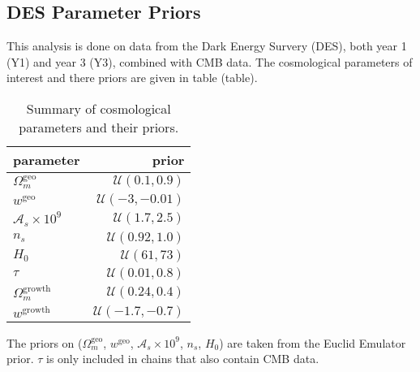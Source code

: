 \subsection{DES Parameter Priors}
This analysis is done on data from the Dark Energy Survery (DES), both year 1 (Y1) and year 3 (Y3), combined with CMB data. The cosmological parameters of interest and there priors are given in table (table).
\begin{table}
\centering
\begin{tabular}{lr}
	\hline
	parameter & prior \\
	\hline\hline
	$\Omega_m^{\text{geo}}$    & $\mathcal{U}(0.1,0.9)$   \\
	$w^{\mathrm{geo}}$         & $\mathcal{U}(-3,-0.01)$  \\
	$\mathcal{A}_s\times10^9$  & $\mathcal{U}(1.7,2.5)$   \\
	$n_s$                      & $\mathcal{U}(0.92,1.0)$  \\
	$H_0$                      & $\mathcal{U}(61,73)$     \\
	$\tau$                     & $\mathcal{U}(0.01,0.8)$  \\
	$\Omega_m^{\text{growth}}$ & $\mathcal{U}(0.24,0.4)$  \\
	$w^{\mathrm{growth}}$      & $\mathcal{U}(-1.7,-0.7)$ \\
	\hline
\end{tabular}
\caption{Summary of cosmological parameters and their priors.}
\end{table}
The priors on ($\Omega_m^{\text{geo}}$, $w^{\mathrm{geo}}$, $\mathcal{A}_s\times10^9$, $n_s$, $H_0$) are taken from the Euclid Emulator prior. $\tau$ is only included in chains that also contain CMB data.
